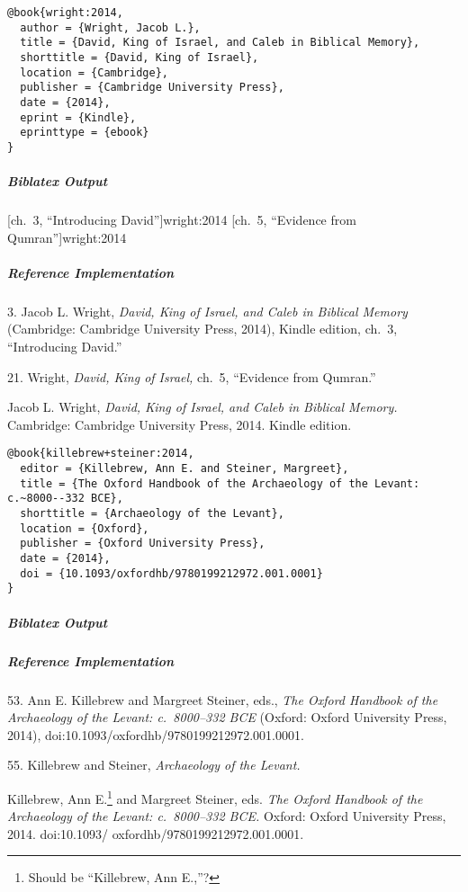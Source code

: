 \documentclass[a4paper]{article}
\newenvironment{biboutput}{%
  \subparagraph{Biblatex Output}
}{\color{black}}
\newenvironment{refimp}{%
  \subparagraph{Reference Implementation}
  \color{reference-colour}
  \rm
}{\par\color{black}}
\begin{document}
\medskip

\begin{lstlisting}
@book{wright:2014,
  author = {Wright, Jacob L.},
  title = {David, King of Israel, and Caleb in Biblical Memory},
  shorttitle = {David, King of Israel},
  location = {Cambridge},
  publisher = {Cambridge University Press},
  date = {2014},
  eprint = {Kindle},
  eprinttype = {ebook}
}
\end{lstlisting}

\begin{biboutput}
  [ch.~3, \mkbibquote{Introducing David}]{wright:2014}
  [ch.~5, \mkbibquote{Evidence from Qumran}]{wright:2014}
\end{biboutput}

\begin{refimp}
  3. Jacob L. Wright, \emph{David, King of Israel, and Caleb in Biblical
  Memory} (Cambridge: Cambridge University Press, 2014), Kindle edition,
  ch.~3, “Introducing David.”

  21. Wright, \emph{David, King of Israel,} ch.~5, “Evidence from Qumran.”

  \hangindent\bibindent Jacob L. Wright, \emph{David, King of Israel, and
  Caleb in Biblical Memory.} Cambridge: Cambridge University Press, 2014.
  Kindle edition.
\end{refimp}

\begin{lstlisting}
@book{killebrew+steiner:2014,
  editor = {Killebrew, Ann E. and Steiner, Margreet},
  title = {The Oxford Handbook of the Archaeology of the Levant: c.~8000--332 BCE},
  shorttitle = {Archaeology of the Levant},
  location = {Oxford},
  publisher = {Oxford University Press},
  date = {2014},
  doi = {10.1093/oxfordhb/9780199212972.001.0001}
}
\end{lstlisting}

\begin{biboutput}
\end{biboutput}

\begin{refimp}
  53. Ann E. Killebrew and Margreet Steiner, eds., \emph{The Oxford Handbook
  of the Archaeology of the Levant: c.~8000–332 BCE} (Oxford: Oxford
  University Press, 2014), doi:10.1093/oxfordhb/9780199212972.001.0001.

  55. Killebrew and Steiner, \emph{Archaeology of the Levant.}

  \hangindent\bibindent Killebrew, Ann E.\footnote{Should be “Killebrew, Ann
  E.,”?} and Margreet Steiner, eds. \emph{The Oxford Handbook of the
  Archaeology of the Levant: c.~8000–332 BCE.} Oxford: Oxford University
  Press, 2014. doi:10.1093/ oxfordhb/9780199212972.001.0001.
\end{refimp}
\end{document}
